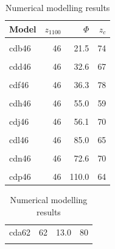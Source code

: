 \documentclass[draft,linenumbers]{agujournal2018}
\begin{document}
\begin{landscape}\begin{table}
\caption{\label{tab:zc.results}Numerical modelling results}

\centering
\fontsize{8}{10}\selectfont
\begin{tabular}[t]{lrrr}
\toprule
Model & $z_{1100}$ & $\Phi$ & \vphantom{3} $z_c$\\
\midrule
\cellcolor{gray!6}{cda46} & \cellcolor{gray!6}{46} & \cellcolor{gray!6}{13.0} & \cellcolor{gray!6}{66}\\
cdb46 & 46 & 21.5 & 74\\
\cellcolor{gray!6}{cdc46} & \cellcolor{gray!6}{46} & \cellcolor{gray!6}{26.1} & \cellcolor{gray!6}{69}\\
cdd46 & 46 & 32.6 & 67\\
\cellcolor{gray!6}{cde46} & \cellcolor{gray!6}{46} & \cellcolor{gray!6}{22.0} & \cellcolor{gray!6}{72}\\
\addlinespace
cdf46 & 46 & 36.3 & 78\\
\cellcolor{gray!6}{cdg46} & \cellcolor{gray!6}{46} & \cellcolor{gray!6}{44.0} & \cellcolor{gray!6}{78}\\
cdh46 & 46 & 55.0 & 59\\
\cellcolor{gray!6}{cdi46} & \cellcolor{gray!6}{46} & \cellcolor{gray!6}{34.0} & \cellcolor{gray!6}{80}\\
cdj46 & 46 & 56.1 & 70\\
\addlinespace
\cellcolor{gray!6}{cdk46} & \cellcolor{gray!6}{46} & \cellcolor{gray!6}{68.0} & \cellcolor{gray!6}{58}\\
cdl46 & 46 & 85.0 & 65\\
\cellcolor{gray!6}{cdm46} & \cellcolor{gray!6}{46} & \cellcolor{gray!6}{44.0} & \cellcolor{gray!6}{79}\\
cdn46 & 46 & 72.6 & 70\\
\cellcolor{gray!6}{cdo46} & \cellcolor{gray!6}{46} & \cellcolor{gray!6}{88.0} & \cellcolor{gray!6}{68}\\
\addlinespace
cdp46 & 46 & 110.0 & 64\\
\bottomrule
\end{tabular}
\centering
\begin{tabular}[t]{lrrr}
\toprule
\cellcolor{gray!6}{Model} & \cellcolor{gray!6}{$z_{1100}$} & \cellcolor{gray!6}{$\Phi$} & \cellcolor{gray!6}{\vphantom{2} $z_c$}\\
\midrule
cda62 & 62 & 13.0 & 80\\
\cellcolor{gray!6}{cdb62} & \cellcolor{gray!6}{62} & \cellcolor{gray!6}{21.5} & \cellcolor{gray!6}{79}\\

\end{tabular}
\end{table}
\end{landscape}
\end{document}
